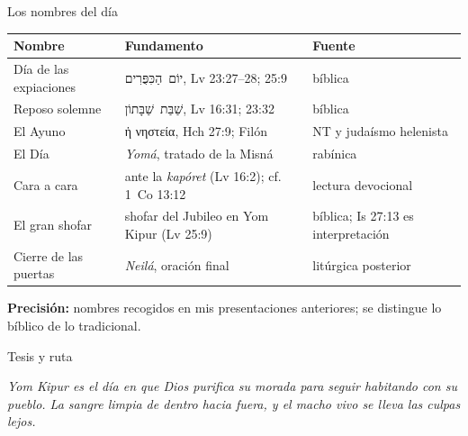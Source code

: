 \documentclass[hyperref={bookmarks=false},aspectratio=169]{beamer}
\newcommand{\heb}[1]{\mbox{\foreignlanguage{hebrew}{#1}}}
\newcommand{\grc}[1]{\foreignlanguage{ancientgreek}{#1}}
\newcommand{\precision}[1]{{\footnotesize\color{sepia}\textbf{Precisión:} #1}}
\begin{document}
\begin{frame}{Los nombres del día}
\scriptsize\renewcommand{\arraystretch}{1.18}
\begin{tabular}{@{}L{3.0cm}L{5.0cm}L{3.4cm}@{}}
\toprule
\textbf{Nombre} & \textbf{Fundamento} & \textbf{Fuente} \\ \midrule
Día de las expiaciones & \heb{יוֹם הַכִּפֻּרִים}, Lv 23:27--28; 25:9 & bíblica \\
Reposo solemne & \heb{שַׁבַּת שַׁבָּתוֹן}, Lv 16:31; 23:32 & bíblica \\
El Ayuno & \grc{ἡ νηστεία}, Hch 27:9; Filón & NT y judaísmo helenista \\
El Día & \emph{Yomá}, tratado de la Misná & rabínica \\
Cara a cara & ante la \emph{kapóret} (Lv 16:2); cf. 1~Co 13:12 & lectura devocional \\
El gran shofar & shofar del Jubileo en Yom Kipur (Lv 25:9) & bíblica; Is 27:13 es interpretación \\
Cierre de las puertas & \emph{Neilá}, oración final & litúrgica posterior \\
\bottomrule
\end{tabular}\par\medskip
\precision{nombres recogidos en mis presentaciones anteriores; se distingue lo bíblico de lo tradicional.}
\end{frame}

\begin{frame}{Tesis y ruta}
\begin{tcolorbox}[colback=papiro,colframe=tierraroja,boxrule=1.2pt,arc=3pt]
\centering\small\itshape Yom Kipur es el día en que Dios purifica su morada para seguir habitando con su pueblo. La sangre limpia de dentro hacia fuera, y el macho vivo se lleva las culpas lejos.
\end{tcolorbox}
\centering
{}
\end{frame}
\end{document}
